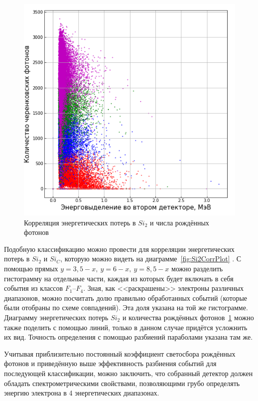 \documentclass[12pt,a4paper]{report} %
\begin{document}
\begin{figure}[bh]
\begin{center}
	\includegraphics[scale=0.5]{pictures/GEANT/Si2CorrCerCount.png}
	\caption{Корреляция энергетических потерь в $Si_2$ и числа рождённых фотонов}
	\label{fig:Si2CerCorrPlot}
\end{center}
\end{figure}
Подобную классификацию можно провести для корреляции энергетических потерь в $Si_2$ и $Si_C$, которую можно видеть на диаграмме~\ref{fig:Si2CorrPlot} \afterpage{\clearpage}. С помощью прямых $y=3,5-x,~y=6-x,~y=8,5-x$ можно разделить гистограмму на отдельные части, каждая из которых будет включать в себя события из классов $F_1$--$F_4$. Зная, как <<раскрашены>> электроны различных диапазонов, можно посчитать долю правильно обработанных событий (которые были отобраны по схеме совпадений). Эта доля указана на той же гистограмме. 
Диаграмму энергетических потерь $Si_2$ и количества рождённых фотонов~\ref{fig:Si2CerCorrPlot}\afterpage{\clearpage} можно также поделить с помощью линий, только в данном случае придётся усложнить их вид. Точность определения с помощью разбиений параболами указана там же. 

Учитывая приблизительно постоянный коэффициент светосбора рождённых фотонов и приведённую выше эффективность разбиения событий для последующей классификации, можно заключить, что собранный детектор должен обладать спектрометрическими свойствами, позволяющими грубо определять энергию электрона в 4 энергетических диапазонах. 
\end{document}
